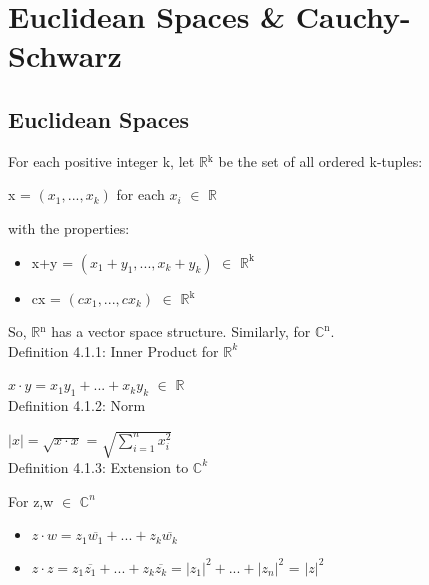 \newpage
\section[Day 4: Euclidean Spaces \& Cauchy-Schwarz]
{Euclidean Spaces \& Cauchy-Schwarz}





\subsection{Euclidean Spaces}

	For each positive integer k, let $\mathbb{R}$$^\text{k}$ be the set of all ordered k-tuples:

	\qquad x = $(x_1,...,x_k)$	\qquad \qquad for each $x_i$ $\in$ $\mathbb{R}$

	with the properties:
	\begin{itemize}[leftmargin=1cm, itemsep=0.4em]
		\item x+y = $(x_1+y_1,...,x_k+y_k)$ $\in$ $\mathbb{R}^{\text{k}}$
	
		\item cx = $(cx_1,...,cx_k)$ $\in$ $\mathbb{R}$$^\text{k}$
	\end{itemize}

	So, $\mathbb{R}$$^\text{n}$ has a vector space structure. Similarly, for $\mathbb{C}^{\text{n}}$. \\


{ \color{blue} Definition 4.1.1: Inner Product for $\mathbb{R}^k$} 

	\qquad $x \cdot y = x_1y_1 + ... + x_ky_k$ $\in$ $\mathbb{R}$ \\

{ \color{blue} Definition 4.1.2: Norm }

	\qquad $|x| = \sqrt{x \cdot x}$ = $\sqrt{\sum_{i=1}^n x_i^2}$ \\

{ \color{blue} Definition 4.1.3: Extension to $\mathbb{C}^k$ } 

	\qquad For z,w $\in$ $\mathbb{C}^n$
	\begin{itemize}[leftmargin=2cm, itemsep=0.4em]
		\item $z \cdot w = z_1\overline{w_1} + ... + z_k\overline{w_k}$
	
		\item $z \cdot z = z_1\overline{z_1} + ... + z_k\overline{z_k}
			= |z_1|^2 + ... + |z_n|^2$ = $|z|^2$
	\end{itemize}





